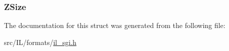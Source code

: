 \hypertarget{structi_sgi_header_aa134f9ab8311e8a4c75506524245c18a}{
\subsubsection[{Z\-Size}]{ Z\-Size}}\label{structi_sgi_header_aa134f9ab8311e8a4c75506524245c18a}


The documentation for this struct was generated from the following file\-:\begin{DoxyCompactItemize}
\item 
src/\-I\-L/formats/\hyperlink{il__sgi_8h}{il\-\_\-sgi.\-h}\end{DoxyCompactItemize}
